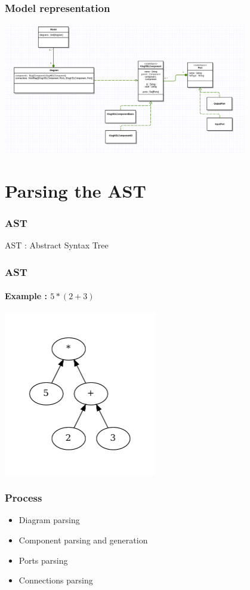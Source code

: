 \documentclass[11pt, handout]{beamer}
\begin{document}
\begin{frame}
  \frametitle{Model representation}
  \begin{center}
    \includegraphics[width=0.8\textwidth]{class-diagram-intermeditate-model}
  \end{center}
\end{frame}

\section{Parsing the AST}

\begin{frame}
  \frametitle{AST}
  \begin{tcolorbox}
  AST : Abstract Syntax Tree
  \end{tcolorbox}
\end{frame}

\begin{frame}
  \frametitle{AST}
  \framesubtitle{Example : $5 * (2 + 3)$}
  \begin{center}
    \includegraphics[width=0.5\textwidth]{ast_example}
  \end{center}
\end{frame}

\begin{frame}
  \frametitle{Process}
  \begin{itemize}
  \item Diagram parsing
  \item Component parsing and generation
  \item Ports parsing
  \item Connections parsing
  \end{itemize}
\end{frame}
\end{document}
